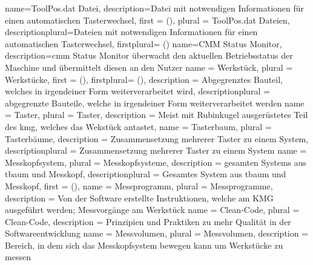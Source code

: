{
    name={ToolPos.dat Datei},
    description={Datei mit notwendigen Informationen für einen automatischen Tasterwechsel},
    first = { ()},
    plural = {ToolPos.dat Dateien},
    descriptionplural={Dateien mit notwendigen Informationen für einen automatischen Tasterwechsel},
    firstplural={ ()}
}
{
    name={CMM Status Monitor},
    description={\gls{cmm} Status Monitor überwacht den aktuellen Betriebsstatus der Maschine und übermittelt diesen an den Nutzer}
}
{
    name = {Werkstück},
    plural = {Werkstücke},
    first = { ()},
    firstplural={ ()},
    description = {Abgegrenztes Bauteil, welches in irgendeiner Form weiterverarbeitet wird},
    descriptionplural = {abgegrenzte Bauteile, welche in irgendeiner Form weiterverarbeitet werden}
}
{
    name = {Taster},
    plural = {Taster},
    description = {Meist mit Rubinkugel ausgerüstetes Teil des \gls{kmg}, welches das Wekstück antastet},
}
{
    name = {Tasterbaum},
    plural = {Tasterbäume},
    description = {Zusammensetzung mehrerer Taster zu einem System},
    descriptionplural = {Zusammensetzung mehrerer Taster zu einem System}
}
{
    name = {Messkopfsystem},
    plural = {Messkopfsysteme},
    description = {gesamten Systems aus \gls{tbaum} und Messkopf},
    descriptionplural = {Gesamtes System aus \gls{tbaum} und Messkopf},
    first = { ()},
}
{
    name = {Messprogramm},
    plural = {Messprogramme},
    description = {Von der Software erstellte Instruktionen, welche am KMG ausgeführt werden; Messvorgänge am Werkstück}
}
{
    name = {Clean-Code},
    plural = {Clean-Code},
    description = {Prinzipien und Praktiken zu mehr Qualität in der Softwareentwicklung}
}
{
    name = {Messvolumen},
    plural = {Messvolumen},
    description = {Bereich, in dem sich das Messkopfsystem bewegen kann um Werkstücke zu messen}
}
